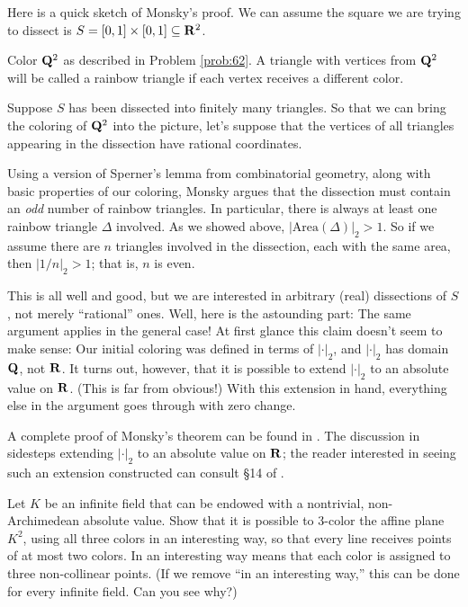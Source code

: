 \begin{rmk} Here is a quick sketch of Monsky's proof. We can assume the square we are trying to dissect is $S = [0,1]\times [0,1] \subseteq \mathbf{R}^2$. 

Color $\mathbf{Q}^2$ as described in Problem \ref{prob:62}. A triangle with vertices from $\mathbf{Q}^2$ will be called a \textsf{rainbow triangle} if each vertex receives a different color. 

Suppose $S$ has been dissected into finitely many triangles. So that we can bring the coloring of $\mathbf{Q}^2$ into the picture, let's suppose that the vertices of all triangles appearing in the dissection have rational coordinates. 

Using a version of Sperner's lemma from combinatorial geometry, along with basic properties of our coloring, Monsky argues that the dissection must contain an \emph{odd} number of rainbow triangles. In particular, there is always at least one rainbow triangle $\Delta$ involved. As we showed above, $|\mathrm{Area}(\Delta)|_2 > 1$. So if we assume there are $n$ triangles involved in the dissection, each with the same area, then $|1/n|_2 > 1$; that is, $n$ is even. 

This is all well and good, but we are interested in arbitrary (real) dissections of $S$, not merely ``rational'' ones. Well, here is the astounding part: The same argument applies in the general case! At first glance this claim doesn't seem to make sense: Our initial coloring was defined in terms of $|\cdot|_2$, and $|\cdot|_2$ has domain $\mathbf{Q}$, not $\mathbf{R}$. It turns out, however, that it is possible to extend $|\cdot|_2$ to an absolute value on $\mathbf{R}$. (This is far from obvious!) With this extension in hand, everything else in the argument goes through with zero change.

A complete proof of Monsky's theorem can be found in \cite[Chapter 22]{AZ18}. The discussion in \cite{AZ18} sidesteps extending $|\cdot|_2$ to an absolute value on $\mathbf{R}$; the reader interested in seeing such an extension constructed can consult \S14 of  \cite{schikhof}.
\end{rmk}

\begin{challenge} Let $K$ be an infinite field that can be endowed with a nontrivial, non-Archimedean absolute value. Show that it is possible to 3-color the affine plane $K^2$, using all three colors in an interesting way, so that every line receives points of at most two colors.  \textsf{In an interesting way} means that each color is assigned to three non-collinear points. (If we remove ``in an interesting way,'' this can be done for every infinite field. Can you see why?)
\end{challenge}

